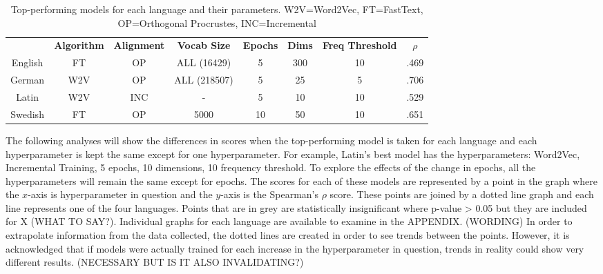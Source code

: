 \begin{table}[h]
\centering
\begin{tabular}{cccccccc} 
\toprule
\textbf{ } & \textbf{ Algorithm } & \textbf{ Alignment } & \textbf{ Vocab Size } & \textbf{ Epochs } & \textbf{ Dims } & \textbf{ Freq Threshold } & \textbf{ $\rho$ }  \\
English    & FT              & OP               & ALL (16429)      & 5                 & 300             & 10               & .469            \\
German     & W2V             & OP               & ALL (218507)     & 5                 & 25              & 5                & .706            \\
Latin      & W2V             & INC              & -                & 5                 & 10              & 10               & .529            \\
Swedish    & FT              & OP               & 5000             & 10                & 50              & 10               & .651            \\
\bottomrule
\end{tabular}
\caption{Top-performing models for each language and their parameters. W2V=Word2Vec, FT=FastText, OP=Orthogonal Procrustes, INC=Incremental}
\label{tab:top-models}
\end{table}

The following analyses will show the differences in scores when the top-performing model is taken for each language and each hyperparameter is kept the same except for one hyperparameter. For example, Latin’s best model has the hyperparameters: Word2Vec, Incremental Training, 5 epochs, 10 dimensions, 10 frequency threshold. To explore the effects of the change in epochs, all the hyperparameters will remain the same except for epochs. The scores for each of these models are represented by a point in the graph where the $x$-axis is hyperparameter in question and the $y$-axis is  the Spearman's $\rho$ score. These points are joined by a dotted line graph and each line represents one of the four languages. Points that are in grey are statistically insignificant where p-value > 0.05 but they are included for X (WHAT TO SAY?). Individual graphs for each language are available to examine in the APPENDIX. (WORDING) In order to extrapolate information from the data collected, the dotted lines are created in order to see trends between the points. However, it is acknowledged that if models were actually trained for each increase in the hyperparameter in question, trends in reality could show very different results. (NECESSARY BUT IS IT ALSO INVALIDATING?)

